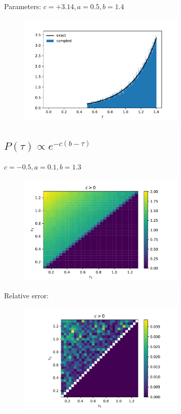 \documentclass[12pt, two sided]{article}
\begin{document}
Parameters: $ c=+3.14 , a = 0.5, b = 1.4$

\begin{figure}[h!]
\includegraphics[width=8cm]{../figures/case2_cpos.pdf}
\end{figure}

\subsection{$P(\tau) \propto e^{-c(b-\tau)}$}

$ c=-0.5 , a = 0.1, b = 1.3 $

\begin{figure}[h!]
\includegraphics[width=8cm]{../figures/0.100000_1.300000_0.500000_sampled.pdf}
\end{figure}

Relative error:

\begin{figure}[h!]
\includegraphics[width=8cm]{../figures/0.100000_1.300000_0.500000_relativeError_masked.pdf}
\end{figure}
\end{document}
